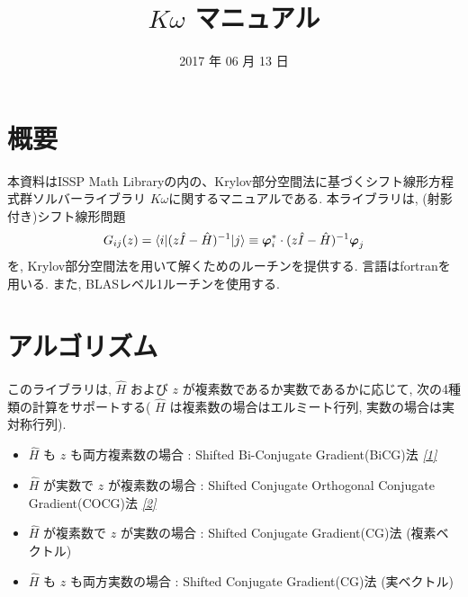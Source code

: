 \documentclass[letterpaper,10pt,dvipdfmx,openany]{sphinxmanual}
\title{$K\omega$ マニュアル}
\date{2017 年 06 月 13 日}
\author{}
\begin{document}
\maketitle
\tableofcontents
{}\label{index::doc}



\chapter{概要}
\label{komega_overview_ja::doc}\label{komega_overview_ja:welcome-to-s-documentation}\label{komega_overview_ja:id1}
本資料はISSP Math
Libraryの内の、Krylov部分空間法に基づくシフト線形方程式群ソルバーライブラリ
\(K\omega\)に関するマニュアルである. 本ライブラリは,
(射影付き)シフト線形問題
\begin{gather}
\begin{split}\begin{align}
  G_{i j}(z) = \langle i | (z {\hat I} -{\hat H})^{-1}| j \rangle \equiv
  {\boldsymbol \varphi}_i^{*} \cdot (z{\hat I}-{\hat H})^{-1} {\boldsymbol \varphi}_j
  \end{align}\end{split}\notag
\end{gather}
を, Krylov部分空間法を用いて解くためのルーチンを提供する.
言語はfortranを用いる. また, BLASレベル1ルーチンを使用する.


\chapter{アルゴリズム}
\label{komega_algorithm_ja::doc}\label{komega_algorithm_ja:id1}
このライブラリは,
\({\hat H}\) および \(z\) が複素数であるか実数であるかに応じて,
次の4種類の計算をサポートする( \({\hat H}\) は複素数の場合はエルミート行列,
実数の場合は実対称行列).
\begin{itemize}
\item {} 
\({\hat H}\) も \(z\) も両方複素数の場合 : Shifted
Bi-Conjugate Gradient(BiCG)法 {\hyperref[komega_ref_ja:ref]{\emph{{[}1{]}}}}

\item {} 
\({\hat H}\) が実数で \(z\) が複素数の場合 : Shifted
Conjugate Orthogonal Conjugate Gradient(COCG)法 {\hyperref[komega_ref_ja:ref]{\emph{{[}2{]}}}}

\item {} 
\({\hat H}\) が複素数で \(z\) が実数の場合 : Shifted
Conjugate Gradient(CG)法 (複素ベクトル)

\item {} 
\({\hat H}\) も \(z\) も両方実数の場合 : Shifted Conjugate
Gradient(CG)法 (実ベクトル)

\end{itemize}
\end{document}

